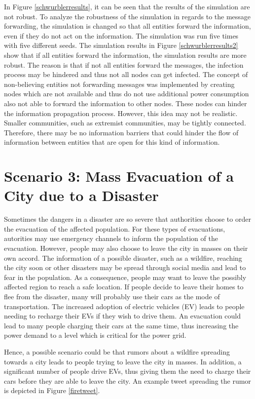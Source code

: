 In Figure \ref{schwurblerresults}, it can be seen that 
the results of the simulation are not robust. To analyze the 
robustness of the simulation in regards to the message 
forwarding, the simulation is changed so that all entities
forward the information, even if they do not act on the information. 
The simulation was run five times with five different seeds. 
The simulation results in Figure \ref{schwurblerresults2} show 
that if all entities forward 
the information, the simulation results are more robust. 
The reason is that if not all entities forward the messages,
the infection process may be hindered and thus not
all nodes can get infected. The concept of non-believing entities
not forwarding messages
was implemented by creating nodes which are not available and thus
do not use additional power consumption
also not able to forward the information to other nodes.
These nodes can hinder the information propagation process.
However, this idea may not be realistic. Smaller communities,
such as extremist communities, may 
be tightly connected. Therefore, there may be no information 
barriers that could hinder the flow of information between 
entities that are open for this kind of information.


\section{Scenario 3: Mass Evacuation of a City due to a Disaster}
\label{scenario3all}

Sometimes the dangers in a disaster are so severe that 
authorities choose to order the evacuation of the affected population.
For these types of evacuations, autorities may use emergency channels 
to inform the population of the evacuation.
However, people may also choose to leave the city in masses on their own accord.
The information of a possible disaster, such as a wildfire, reaching the
city soon or other disasters may be spread through social media and 
lead to fear in the population. As a consequence, people may 
want to leave the possibly affected region to reach a safe location.
If people decide to leave their homes to flee from the disaster, many
will probably use their cars as the mode of transportation.
The increased adoption of electric vehicles (EV)
leads to people needing to recharge their EVs if they wish 
to drive them. An evacuation could lead to many people charging
their cars at the same time, thus increasing the power demand 
to a level which is critical for the power grid. 

Hence, a possible scenario could be that 
rumors about a wildfire spreading towards a city leads to people
trying to leave the city in masses. In addition, a significant 
number of people drive EVs, thus giving them the need to charge
their cars before they are able to leave the city. An example
tweet spreading the rumor is depicted in Figure \ref{firetweet}.

